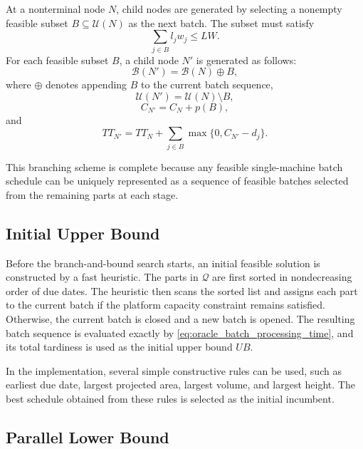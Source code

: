 \documentclass[letterpaper, 10 pt, conference]{ieeeconf}  %
\begin{document}
At a nonterminal node $N$, child nodes are generated by selecting a nonempty
feasible subset $B\subseteq \mathcal{U}(N)$ as the next batch. The subset
must satisfy
\begin{equation}
	\sum_{j\in B} l_jw_j \le LW .
\end{equation}
For each feasible subset $B$, a child node $N'$ is generated as follows:
\begin{equation}
	\mathcal{B}(N')
	=
	\mathcal{B}(N)\oplus B,
\end{equation}
where $\oplus$ denotes appending $B$ to the current batch sequence,
\begin{equation}
	\mathcal{U}(N')
	=
	\mathcal{U}(N)\setminus B,
\end{equation}
\begin{equation}
	C_{N'}
	=
	C_N+p(B),
\end{equation}
and
\begin{equation}
	TT_{N'}
	=
	TT_N
	+
	\sum_{j\in B}
	\max\{0,C_{N'}-d_j\}.
\end{equation}

This branching scheme is complete because any feasible single-machine batch
schedule can be uniquely represented as a sequence of feasible batches
selected from the remaining parts at each stage.

\subsection{Initial Upper Bound}

Before the branch-and-bound search starts, an initial feasible solution is
constructed by a fast heuristic. The parts in $\mathcal{Q}$ are first sorted
in nondecreasing order of due dates. The heuristic then scans the sorted
list and assigns each part to the current batch if the platform capacity
constraint remains satisfied. Otherwise, the current batch is closed and a
new batch is opened. The resulting batch sequence is evaluated exactly by
\eqref{eq:oracle_batch_processing_time}, and its total tardiness is used as
the initial upper bound $UB$.

In the implementation, several simple constructive rules can be used, such
as earliest due date, largest projected area, largest volume, and largest
height. The best schedule obtained from these rules is selected as the
initial incumbent.

\subsection{Parallel Lower Bound}
\end{document}
